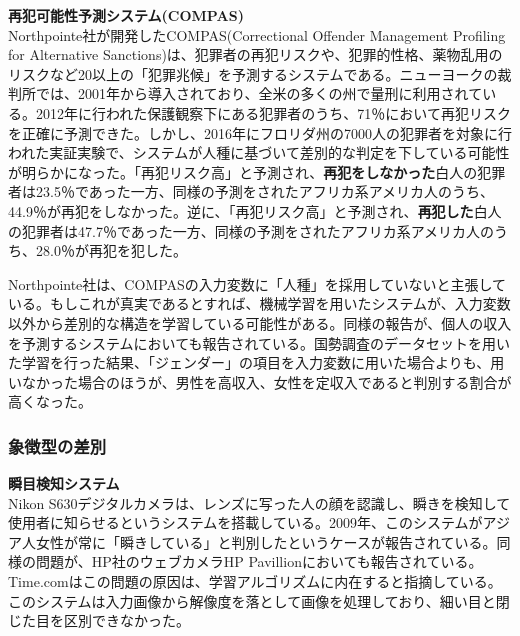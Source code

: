\documentclass[b5j,twoside,twocolumn]{utarticle}
\begin{document}
\textbf{再犯可能性予測システム(COMPAS)}\\
Northpointe社が開発したCOMPAS(Correctional Offender Management Profiling for Alternative Sanctions)は、犯罪者の再犯リスクや、犯罪的性格、薬物乱用のリスクなど20以上の「犯罪兆候」を予測するシステムである。ニューヨークの裁判所では、2001年から導入されており、全米の多くの州で量刑に利用されている。2012年に行われた保護観察下にある犯罪者のうち、71％において再犯リスクを正確に予測できた。しかし、2016年にフロリダ州の7000人の犯罪者を対象に行われた実証実験で、システムが人種に基づいて差別的な判定を下している可能性が明らかになった。「再犯リスク高」と予測され、\textbf{再犯をしなかった}白人の犯罪者は23.5％であった一方、同様の予測をされたアフリカ系アメリカ人のうち、44.9％が再犯をしなかった。逆に、「再犯リスク高」と予測され、\textbf{再犯した}白人の犯罪者は47.7％であった一方、同様の予測をされたアフリカ系アメリカ人のうち、28.0％が再犯を犯した。

Northpointe社は、COMPASの入力変数に「人種」を採用していないと主張している。もしこれが真実であるとすれば、機械学習を用いたシステムが、入力変数以外から差別的な構造を学習している可能性がある。同様の報告が、個人の収入を予測するシステムにおいても報告されている。国勢調査のデータセットを用いた学習を行った結果、「ジェンダー」の項目を入力変数に用いた場合よりも、用いなかった場合のほうが、男性を高収入、女性を定収入であると判別する割合が高くなった。


\subsubsection*{象徴型の差別}
\textbf{瞬目検知システム}\\
Nikon S630デジタルカメラは、レンズに写った人の顔を認識し、瞬きを検知して使用者に知らせるというシステムを搭載している。2009年、このシステムがアジア人女性が常に「瞬きしている」と判別したというケースが報告されている。同様の問題が、HP社のウェブカメラHP Pavillionにおいても報告されている。Time.comはこの問題の原因は、学習アルゴリズムに内在すると指摘している。このシステムは入力画像から解像度を落として画像を処理しており、細い目と閉じた目を区別できなかった。
\end{document}
